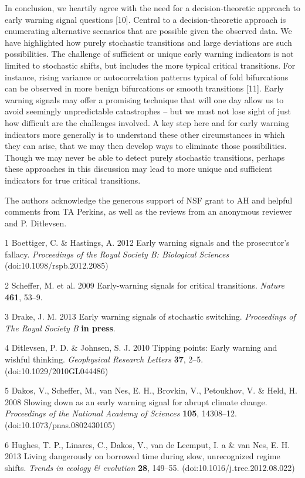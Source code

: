 \documentclass{article}
\begin{document}
In conclusion, we heartily agree with the need for a decision-theoretic
approach to early warning signal questions {[}10{]}. Central to a
decision-theoretic approach is enumerating alternative scenarios that
are possible given the observed data. We have highlighted how purely
stochastic transitions and large deviations are such possibilities. The
challenge of sufficient or unique early warning indicators is not
limited to stochastic shifts, but includes the more typical critical
transitions. For instance, rising variance or autocorrelation patterns
typical of fold bifurcations can be observed in more benign bifurcations
or smooth transitions {[}11{]}. Early warning signals may offer a
promising technique that will one day allow us to avoid seemingly
unpredictable catastrophes -- but we must not lose sight of just how
difficult are the challenges involved. A key step here and for early
warning indicators more generally is to understand these other
circumstances in which they can arise, that we may then develop ways to
eliminate those possibilities. Though we may never be able to detect
purely stochastic transitions, perhaps these approaches in this
discussion may lead to more unique and sufficient indicators for true
critical transitions.

The authors acknowledge the generous support of NSF grant to AH and
helpful comments from TA Perkins, as well as the reviews from an
anonymous reviewer and P. Ditlevsen.

1 Boettiger, C. \& Hastings, A. 2012 Early warning signals and the
prosecutor's fallacy. \emph{Proceedings of the Royal Society B:
Biological Sciences} (doi:10.1098/rspb.2012.2085)

2 Scheffer, M. et al. 2009 Early-warning signals for critical
transitions. \emph{Nature} \textbf{461}, 53--9.

3 Drake, J. M. 2013 Early warning signals of stochastic switching.
\emph{Proceedings of The Royal Society B} \textbf{in press}.

4 Ditlevsen, P. D. \& Johnsen, S. J. 2010 Tipping points: Early warning
and wishful thinking. \emph{Geophysical Research Letters} \textbf{37},
2--5. (doi:10.1029/2010GL044486)

5 Dakos, V., Scheffer, M., van Nes, E. H., Brovkin, V., Petoukhov, V. \&
Held, H. 2008 Slowing down as an early warning signal for abrupt climate
change. \emph{Proceedings of the National Academy of Sciences}
\textbf{105}, 14308--12. (doi:10.1073/pnas.0802430105)

6 Hughes, T. P., Linares, C., Dakos, V., van de Leemput, I. a \& van
Nes, E. H. 2013 Living dangerously on borrowed time during slow,
unrecognized regime shifts. \emph{Trends in ecology \& evolution}
\textbf{28}, 149--55. (doi:10.1016/j.tree.2012.08.022)
\end{document}
